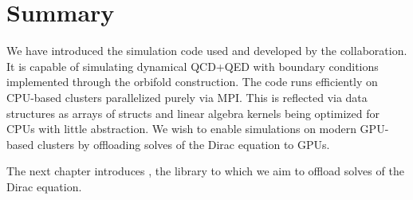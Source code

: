 
\section{Summary}
\label{sec:openqxd:summary}



We have introduced the simulation code \openqxd used and developed by the \RCstar collaboration.
It is capable of simulating dynamical QCD+QED with \Cstar boundary conditions implemented through the orbifold construction.
The code runs efficiently on CPU-based clusters parallelized purely via MPI.
This is reflected via data structures as arrays of structs and linear algebra kernels being optimized for CPUs with little abstraction.
We wish to enable simulations on modern GPU-based clusters by offloading solves of the Dirac equation to GPUs.

The next chapter introduces \quda, the library to which we aim to offload solves of the Dirac equation.
